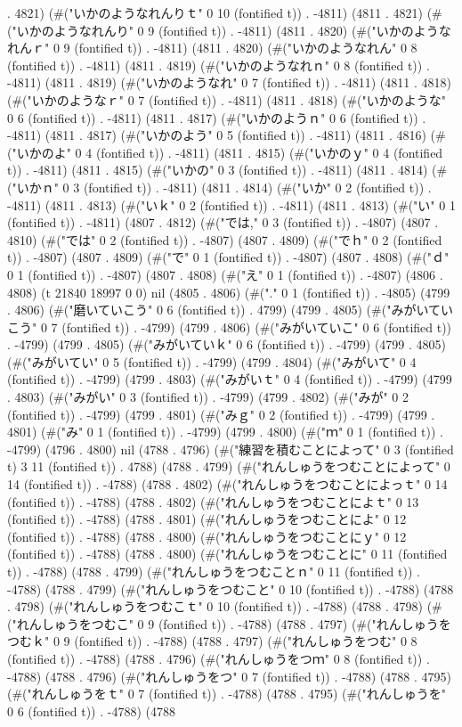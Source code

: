. 4821) (#("いかのようなれんりｔ" 0 10 (fontified t)) . -4811) (4811 . 4821) (#("いかのようなれんり" 0 9 (fontified t)) . -4811) (4811 . 4820) (#("いかのようなれんｒ" 0 9 (fontified t)) . -4811) (4811 . 4820) (#("いかのようなれん" 0 8 (fontified t)) . -4811) (4811 . 4819) (#("いかのようなれｎ" 0 8 (fontified t)) . -4811) (4811 . 4819) (#("いかのようなれ" 0 7 (fontified t)) . -4811) (4811 . 4818) (#("いかのようなｒ" 0 7 (fontified t)) . -4811) (4811 . 4818) (#("いかのような" 0 6 (fontified t)) . -4811) (4811 . 4817) (#("いかのようｎ" 0 6 (fontified t)) . -4811) (4811 . 4817) (#("いかのよう" 0 5 (fontified t)) . -4811) (4811 . 4816) (#("いかのよ" 0 4 (fontified t)) . -4811) (4811 . 4815) (#("いかのｙ" 0 4 (fontified t)) . -4811) (4811 . 4815) (#("いかの" 0 3 (fontified t)) . -4811) (4811 . 4814) (#("いかｎ" 0 3 (fontified t)) . -4811) (4811 . 4814) (#("いか" 0 2 (fontified t)) . -4811) (4811 . 4813) (#("いｋ" 0 2 (fontified t)) . -4811) (4811 . 4813) (#("い" 0 1 (fontified t)) . -4811) (4807 . 4812) (#("では," 0 3 (fontified t)) . -4807) (4807 . 4810) (#("では" 0 2 (fontified t)) . -4807) (4807 . 4809) (#("でｈ" 0 2 (fontified t)) . -4807) (4807 . 4809) (#("で" 0 1 (fontified t)) . -4807) (4807 . 4808) (#("ｄ" 0 1 (fontified t)) . -4807) (4807 . 4808) (#("え" 0 1 (fontified t)) . -4807) (4806 . 4808) (t 21840 18997 0 0) nil (4805 . 4806) (#("." 0 1 (fontified t)) . -4805) (4799 . 4806) (#("磨いていこう" 0 6 (fontified t)) . 4799) (4799 . 4805) (#("みがいていこう" 0 7 (fontified t)) . -4799) (4799 . 4806) (#("みがいていこ" 0 6 (fontified t)) . -4799) (4799 . 4805) (#("みがいていｋ" 0 6 (fontified t)) . -4799) (4799 . 4805) (#("みがいてい" 0 5 (fontified t)) . -4799) (4799 . 4804) (#("みがいて" 0 4 (fontified t)) . -4799) (4799 . 4803) (#("みがいｔ" 0 4 (fontified t)) . -4799) (4799 . 4803) (#("みがい" 0 3 (fontified t)) . -4799) (4799 . 4802) (#("みが" 0 2 (fontified t)) . -4799) (4799 . 4801) (#("みｇ" 0 2 (fontified t)) . -4799) (4799 . 4801) (#("み" 0 1 (fontified t)) . -4799) (4799 . 4800) (#("ｍ" 0 1 (fontified t)) . -4799) (4796 . 4800) nil (4788 . 4796) (#("練習を積むことによって" 0 3 (fontified t) 3 11 (fontified t)) . 4788) (4788 . 4799) (#("れんしゅうをつむことによって" 0 14 (fontified t)) . -4788) (4788 . 4802) (#("れんしゅうをつむことによっｔ" 0 14 (fontified t)) . -4788) (4788 . 4802) (#("れんしゅうをつむことによｔ" 0 13 (fontified t)) . -4788) (4788 . 4801) (#("れんしゅうをつむことによ" 0 12 (fontified t)) . -4788) (4788 . 4800) (#("れんしゅうをつむことにｙ" 0 12 (fontified t)) . -4788) (4788 . 4800) (#("れんしゅうをつむことに" 0 11 (fontified t)) . -4788) (4788 . 4799) (#("れんしゅうをつむことｎ" 0 11 (fontified t)) . -4788) (4788 . 4799) (#("れんしゅうをつむこと" 0 10 (fontified t)) . -4788) (4788 . 4798) (#("れんしゅうをつむこｔ" 0 10 (fontified t)) . -4788) (4788 . 4798) (#("れんしゅうをつむこ" 0 9 (fontified t)) . -4788) (4788 . 4797) (#("れんしゅうをつむｋ" 0 9 (fontified t)) . -4788) (4788 . 4797) (#("れんしゅうをつむ" 0 8 (fontified t)) . -4788) (4788 . 4796) (#("れんしゅうをつｍ" 0 8 (fontified t)) . -4788) (4788 . 4796) (#("れんしゅうをつ" 0 7 (fontified t)) . -4788) (4788 . 4795) (#("れんしゅうをｔ" 0 7 (fontified t)) . -4788) (4788 . 4795) (#("れんしゅうを" 0 6 (fontified t)) . -4788) (4788 